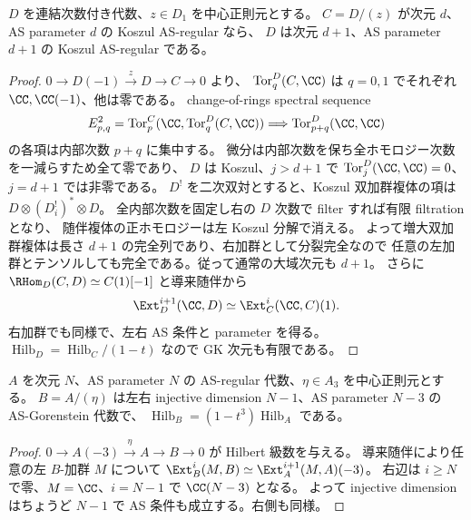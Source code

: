\begin{lemma}\label{lem:pg-central-linear}
$D$ を連結次数付き代数、$z\in D_1$ を中心正則元とする。
$C=D/(z)$ が次元 $d$、AS parameter $d$ の Koszul AS-regular なら、
$D$ は次元 $d+1$、AS parameter $d+1$ の Koszul AS-regular である。
\end{lemma}
\begin{proof}
$0\to D(-1)\xrightarrow{z}D\to C\to0$ より、
$\operatorname{Tor}^D_q(C,\CC)$ は $q=0,1$ でそれぞれ $\CC,\CC(-1)$、他は零である。
change-of-rings spectral sequence
\begin{equation}
E^2_{p,q}=\operatorname{Tor}^C_p(\CC,\operatorname{Tor}^D_q(C,\CC))
\Longrightarrow\operatorname{Tor}^D_{p+q}(\CC,\CC)
\end{equation}
の各項は内部次数 $p+q$ に集中する。
微分は内部次数を保ち全ホモロジー次数を一減らすため全て零であり、
$D$ は Koszul、$j>d+1$ で $\operatorname{Tor}^D_j(\CC,\CC)=0$、$j=d+1$ では非零である。
$D^!$ を二次双対とすると、Koszul 双加群複体の項は $D\otimes(D_i^!)^*\otimes D$。
全内部次数を固定し右の $D$ 次数で filter すれば有限 filtration となり、
随伴複体の正ホモロジーは左 Koszul 分解で消える。
よって増大双加群複体は長さ $d+1$ の完全列であり、右加群として分裂完全なので
任意の左加群とテンソルしても完全である。従って通常の大域次元も $d+1$。
さらに $\RHom_D(C,D)\simeq C(1)[-1]$ と導来随伴から
\begin{equation}
\Ext_D^{i+1}(\CC,D)\simeq\Ext_C^i(\CC,C)(1).
\end{equation}
右加群でも同様で、左右 AS 条件と parameter を得る。
$\operatorname{Hilb}_D=\operatorname{Hilb}_C/(1-t)$ なので GK 次元も有限である。
\end{proof}
\begin{lemma}\label{lem:pg-central-cubic}
$A$ を次元 $N$、AS parameter $N$ の AS-regular 代数、$\eta\in A_3$ を中心正則元とする。
$B=A/(\eta)$ は左右 injective dimension $N-1$、AS parameter $N-3$ の AS-Gorenstein 代数で、
$\operatorname{Hilb}_B=(1-t^3)\operatorname{Hilb}_A$ である。
\end{lemma}
\begin{proof}
$0\to A(-3)\xrightarrow{\eta}A\to B\to0$ が Hilbert 級数を与える。
導来随伴により任意の左 $B$-加群 $M$ について
$\Ext_B^i(M,B)\simeq\Ext_A^{i+1}(M,A)(-3)$。
右辺は $i\geq N$ で零、$M=\CC$、$i=N-1$ で $\CC(N-3)$ となる。
よって injective dimension はちょうど $N-1$ で AS 条件も成立する。右側も同様。
\end{proof}

